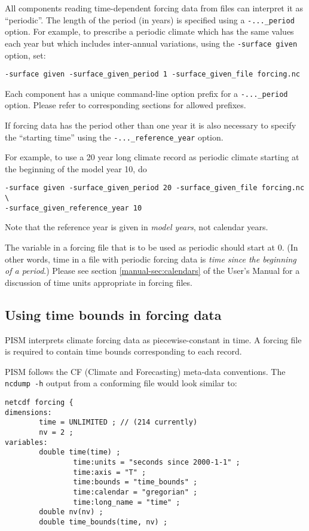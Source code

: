 \documentclass[titlepage,letterpaper,final]{scrartcl}
\begin{document}
All components reading time-dependent forcing data from files can interpret
it as ``periodic''.  The length of the period (in years) is specified using
a \texttt{-..._period} option.  For example, to prescribe a periodic climate
which has the same values each year but which includes
inter-annual variations, using the \texttt{-surface given} option, set:
\begin{verbatim}
-surface given -surface_given_period 1 -surface_given_file forcing.nc
\end{verbatim}

Each component has a unique command-line option prefix for a
\texttt{-..._period} option. Please refer to corresponding sections for
allowed prefixes.

If forcing data has the period other than one year it is also
necessary to specify the ``starting time'' using the
\texttt{-..._reference_year} option.

For example, to use a 20 year long climate record as periodic climate starting
at the beginning of the model year 10, do
\begin{verbatim}
-surface given -surface_given_period 20 -surface_given_file forcing.nc \
-surface_given_reference_year 10
\end{verbatim}

Note that the reference year is given in \emph{model years}, not calendar
years.

The  variable  in a forcing file that is to  be used as periodic
should start at $0$. (In other words, time in a file with periodic forcing data
is  \emph{time  since   the  beginning  of  a  period}.)   Please  see  section
\ref*{manual-sec:calendars}  of the User's Manual for a  discussion  of time  units  appropriate in  forcing
files.


\subsection{Using time bounds in forcing data}
\label{sec:time-bounds}

PISM interprets climate forcing data as piecewise-constant in time. A forcing
file is required to contain time bounds corresponding to each record.

PISM follows the CF (Climate and Forecasting) meta-data conventions. The
\texttt{ncdump -h} output from a conforming file would look similar to:
\begin{verbatim}
netcdf forcing {
dimensions:
        time = UNLIMITED ; // (214 currently)
        nv = 2 ;
variables:
        double time(time) ;
                time:units = "seconds since 2000-1-1" ;
                time:axis = "T" ;
                time:bounds = "time_bounds" ;
                time:calendar = "gregorian" ;
                time:long_name = "time" ;
        double nv(nv) ;
        double time_bounds(time, nv) ;
\end{verbatim}
\end{document}

